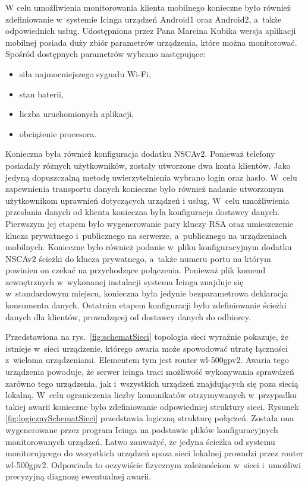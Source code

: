 W celu umożliwienia monitorowania klienta mobilnego konieczne było
również zdefiniowanie w~systemie Icinga urządzeń Android1 oraz
Android2, a~także odpowiednich usług. Udostępniona przez Pana Marcina
Kubika wersja aplikacji mobilnej posiada duży zbiór parametrów
urządzenia, które można monitorować. Spośród dostępnych parametrów
wybrano następujące:

\begin{itemize}
\item siła najmocniejszego sygnału Wi-Fi,
\item stan baterii,
\item liczba uruchomionych aplikacji,
\item obciążenie procesora.
\end{itemize}

Konieczna była również konfiguracja dodatku NSCAv2. Ponieważ telefony
posiadały różnych użytkowników, zostały utworzone dwa konta
klientów. Jako jedyną dopuszczalną metodę uwierzytelnienia wybrano
login oraz hasło. W~celu zapewnienia transportu danych konieczne było
również nadanie utworzonym użytkownikom uprawnień dotyczących urządzeń
i usług. W~celu umożliwienia przesłania danych od klienta konieczna
była konfiguracja dostawcy danych. Pierwszym jej etapem było
wygenerowanie pary kluczy RSA oraz umieszczenie klucza prywatnego
i~publicznego na serwerze, a~publicznego na urządzeniach
mobilnych. Konieczne było również podanie w~pliku konfiguracyjnym
dodatku NSCAv2 ścieżki do klucza prywatnego, a~także numeru portu na
którym powinien on czekać na przychodzące połączenia. Ponieważ plik
komend zewnętrznych w~wykonanej instalacji systemu Icinga znajduje się
w~standardowym miejscu, konieczna była jedynie bezparametrowa
deklaracja konsumenta danych. Ostatnim etapem konfiguracji było
zdefiniowanie ścieżki danych dla klientów, prowadzącej od dostawcy
danych do odbiorcy.

Przedstawiona na rys.~\ref{fig:schematSieci} topologia sieci wyraźnie
pokazuje, że istnieje w~sieci urządzenie, którego awaria może
spowodować utratę łączności z~wieloma urządzeniami. Elementem tym jest
router wl-500gpv2. Awaria tego urządzenia powoduje, że serwer icinga
traci możliwość wykonywania sprawdzeń zarówno tego urządzenia, jak
i~wszystkich urządzeń znajdujących się poza siecią lokalną. W~celu
ograniczenia liczby komunikatów otrzymywanych w~przypadku takiej
awarii konieczne było zdefiniowanie odpowiedniej struktury
sieci. Rysunek \ref{fig:logicznySchematSieci} przedstawia logiczną
strukturę połączeń. Została ona wygenerowane przez program Icinga na
podstawie plików konfiguracyjnych monitorowanych urządzeń. Łatwo
zauważyć, że jedyna ścieżka od systemu monitorującego do wszystkich
urządzeń spoza sieci lokalnej prowadzi przez router
wl-500gpv2. Odpowiada to oczywiście fizycznym zależnościom w~sieci
i~umożliwi precyzyjną diagnozę ewentualnej awarii.


